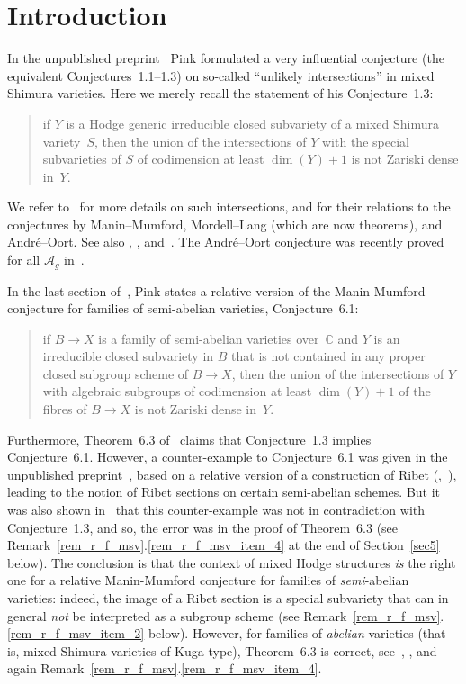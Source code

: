 \documentclass[11pt]{article}
\providecommand{\C}{}
\let\mathcal\mathscr
\theoremstyle{plain}
\theoremstyle{definition}
\numberwithin{equation}{subsection}
\renewcommand{\C}{\mathbb C}
\begin{document}
\section{Introduction}
In the unpublished preprint~\cite{Pink2} Pink formulated a very
influential conjecture (the equivalent Conjectures~1.1--1.3) on
so-called ``unlikely intersections'' in mixed Shimura varieties.
Here we merely recall the statement of his Conjecture~1.3:
\begin{quote}
if $Y$ is a Hodge generic irreducible closed subvariety of a mixed
Shimura variety~$S$, then the union of the intersections of $Y$ with
the special subvarieties of $S$ of codimension at least $\dim(Y)+1$
is not Zariski dense in~$Y$.
\end{quote}
We refer to~\cite{Zannier} for more details on such intersections, and
for their relations to the conjectures by Manin--Mumford,
Mordell--Lang (which are now theorems), and André--Oort. See also
\cite{Pink2}, \cite{Pink1}, and~\cite{KUY}. The André--Oort
conjecture was recently proved for all $\mathcal{A}_g$
in~\cite{Tsimerman}.

In the last section of~\cite{Pink2}, Pink states a relative version of
the Manin-Mumford conjecture for families of semi-abelian varieties,
Conjecture~6.1:
\begin{quote}
if $B\to X$ is a family of semi-abelian varieties over~$\C$ and $Y$
is an irreducible closed subvariety in $B$ that is not contained in
any proper closed subgroup scheme of $B\to X$, then the union of the
intersections of $Y$ with algebraic subgroups of
codimension at least $\dim(Y)+1$ of the fibres of $B\to X$ is not
Zariski dense in~$Y$.
\end{quote}
Furthermore, Theorem~6.3 of~\cite{Pink2} claims that Conjecture~1.3
implies Conjecture~6.1. However, a counter-example to Conjecture~6.1
was given in the unpublished preprint~\cite{Bertrand11}, based on a
relative version of a construction of Ribet
(\cite{Jacquinot-Ribet},~\cite{Ribet}), leading to the notion of Ribet
sections on certain semi-abelian schemes. But it was also shown
in~\cite{Bertrand11} that this counter-example was not in
contradiction with Conjecture~1.3, and so, the error was in the proof
of Theorem~6.3 (see
Remark~\ref{rem_r_f_msv}.\ref{rem_r_f_msv_item_4} at the end of
Section~\ref{sec5} below). The conclusion is
that the context of mixed Hodge structures \emph{is} the right one for
a relative Manin-Mumford conjecture for families of
\emph{semi}-abelian varieties: indeed, the image of a Ribet section is
a special subvariety that can in general \emph{not} be interpreted as
a subgroup scheme (see
Remark~\ref{rem_r_f_msv}.\ref{rem_r_f_msv_item_2} below). However, for
families of \emph{abelian} varieties (that is, mixed Shimura varieties
of Kuga type), Theorem~6.3 is correct, see~\cite[Prop.\,4.6]{Pink1}, \cite[Prop.\,3.4]{Gao-Pisa}, and again
Remark~\ref{rem_r_f_msv}.\ref{rem_r_f_msv_item_4}.
\end{document}
